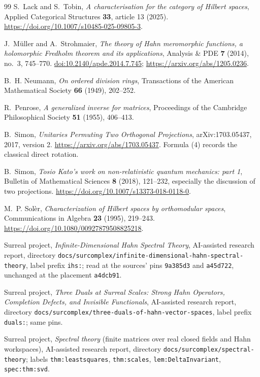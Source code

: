 \documentclass[11pt,letterpaper]{article}
\numberwithin{equation}{section}
\theoremstyle{definition}
\theoremstyle{remark}
\newcommand{\replabel}[1]{\nolinkurl{#1}}
\newcommand{\fn}[1]{\nolinkurl{#1}}
\begin{document}
\begin{thebibliography}{99}
S.~Lack and S.~Tobin, \emph{A characterisation for the category of Hilbert
spaces}, Applied Categorical Structures \textbf{33}, article 13 (2025).
\url{https://doi.org/10.1007/s10485-025-09805-3}.

J.~M\"uller and A.~Strohmaier,
\emph{The theory of Hahn meromorphic functions, a holomorphic
Fredholm theorem and its applications},
Analysis \& PDE \textbf{7} (2014), no.~3, 745--770.
\href{https://doi.org/10.2140/apde.2014.7.745}{doi:10.2140/apde.2014.7.745};
\url{https://arxiv.org/abs/1205.0236}.

B.~H. Neumann, \emph{On ordered division rings},
Transactions of the American Mathematical Society \textbf{66} (1949),
202--252.

R.~Penrose, \emph{A generalized inverse for matrices},
Proceedings of the Cambridge Philosophical Society \textbf{51} (1955),
406--413.

B.~Simon,
\emph{Unitaries Permuting Two Orthogonal Projections},
arXiv:1703.05437, 2017, version 2.
\url{https://arxiv.org/abs/1703.05437}.
Formula (4) records the classical direct rotation.

B.~Simon, \emph{Tosio Kato's work on non-relativistic quantum mechanics:
part 1}, Bulletin of Mathematical Sciences \textbf{8} (2018), 121--232,
especially the discussion of two projections.
\url{https://doi.org/10.1007/s13373-018-0118-0}.

M.~P. Sol\`er, \emph{Characterization of Hilbert spaces by orthomodular
spaces}, Communications in Algebra \textbf{23} (1995), 219--243.
\url{https://doi.org/10.1080/00927879508825218}.

Surreal project, \emph{Infinite-Dimensional Hahn Spectral Theory},
AI-assisted research report, directory
\fn{docs/surcomplex/infinite-dimensional-hahn-spectral-theory}, label prefix
\replabel{ihs:}; read at the sources' pins \texttt{9a385d3} and
\texttt{a45d722}, unchanged at the placement \texttt{a4dcb91}.

Surreal project, \emph{Three Duals at Surreal Scales: Strong Hahn Operators,
Completion Defects, and Invisible Functionals}, AI-assisted research report,
directory \fn{docs/surcomplex/three-duals-of-hahn-vector-spaces}, label
prefix \replabel{duals:}; same pins.

Surreal project, \emph{Spectral theory} (finite matrices over real closed
fields and Hahn workspaces), AI-assisted research report, directory
\fn{docs/surcomplex/spectral-theory}; labels \replabel{thm:leastsquares},
\replabel{thm:scales}, \replabel{lem:DeltaInvariant},
\replabel{spec:thm:svd}.


\end{thebibliography}
\end{document}
